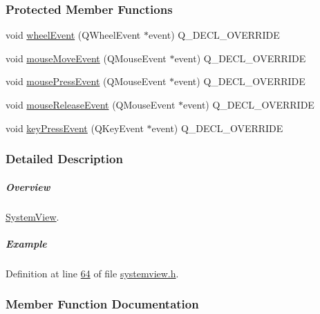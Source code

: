 \subsubsection*{Protected Member Functions}
\begin{DoxyCompactItemize}
\item 
void \hyperlink{group___graphics_gaab2fa6cebf9022eb6bf31497c0789675}{wheel\+Event} (Q\+Wheel\+Event $\ast$event) Q\+\_\+\+D\+E\+C\+L\+\_\+\+O\+V\+E\+R\+R\+I\+D\+E
\item 
void \hyperlink{group___graphics_gab19e233cd697852dd71140971cb6e122}{mouse\+Move\+Event} (Q\+Mouse\+Event $\ast$event) Q\+\_\+\+D\+E\+C\+L\+\_\+\+O\+V\+E\+R\+R\+I\+D\+E
\item 
void \hyperlink{group___graphics_ga42d4a485d6d9bd891d9505a5213cf783}{mouse\+Press\+Event} (Q\+Mouse\+Event $\ast$event) Q\+\_\+\+D\+E\+C\+L\+\_\+\+O\+V\+E\+R\+R\+I\+D\+E
\item 
void \hyperlink{group___graphics_gaa8a2664405194bbe29daa454aead7416}{mouse\+Release\+Event} (Q\+Mouse\+Event $\ast$event) Q\+\_\+\+D\+E\+C\+L\+\_\+\+O\+V\+E\+R\+R\+I\+D\+E
\item 
void \hyperlink{group___graphics_gac28465709119ef75862b33480ad23f56}{key\+Press\+Event} (Q\+Key\+Event $\ast$event) Q\+\_\+\+D\+E\+C\+L\+\_\+\+O\+V\+E\+R\+R\+I\+D\+E
\end{DoxyCompactItemize}


\subsubsection{Detailed Description}
\subparagraph*{Overview}

\hyperlink{class_system_view}{System\+View}.

\subparagraph*{Example}


\begin{DoxyCode}
\end{DoxyCode}
 

Definition at line \hyperlink{systemview_8h_source_l00064}{64} of file \hyperlink{systemview_8h_source}{systemview.\+h}.



\subsubsection{Member Function Documentation}
\hypertarget{class_system_view_a90bd4b070c8abaa5995899154421eb44}{}
